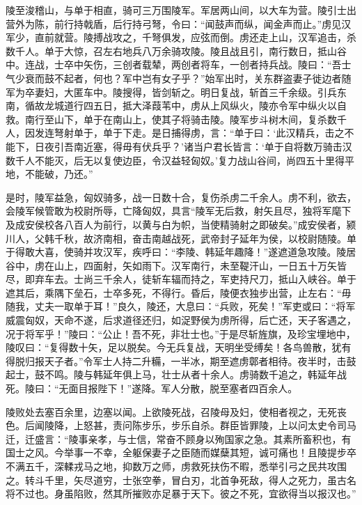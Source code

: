 \documentclass[12pt,UTF8]{ctexbook}
\begin{document}
陵至浚稽山，与单于相直，骑可三万围陵军。军居两山间，以大车为营。陵引士出营外为陈，前行持戟盾，后行持弓弩，令曰：“闻鼓声而纵，闻金声而止。”虏见汉军少，直前就营。陵搏战攻之，千弩俱发，应弦而倒。虏还走上山，汉军追击，杀数千人。单于大惊，召左右地兵八万余骑攻陵。陵且战且引，南行数日，抵山谷中。连战，士卒中矢伤，三创者载辇，两创者将车，一创者持兵战。陵曰：“吾士气少衰而鼓不起者，何也？军中岂有女子乎？”始军出时，关东群盗妻子徙边者随军为卒妻妇，大匿车中。陵搜得，皆剑斩之。明日复战，斩首三千余级。引兵东南，循故龙城道行四五日，抵大泽葭苇中，虏从上风纵火，陵亦令军中纵火以自救。南行至山下，单于在南山上，使其子将骑击陵。陵军步斗树木间，复杀数千人，因发连弩射单于，单于下走。是日捕得虏，言：“单于曰：‘此汉精兵，击之不能下，日夜引吾南近塞，得毋有伏兵乎？’诸当户君长皆言：‘单于自将数万骑击汉数千人不能灭，后无以复使边臣，令汉益轻匈奴。’复力战山谷间，尚四五十里得平地，不能破，乃还。”



是时，陵军益急，匈奴骑多，战一日数十合，复伤杀虏二千余人。虏不利，欲去，会陵军候管敢为校尉所辱，亡降匈奴，具言“陵军无后救，射矢且尽，独将军麾下及成安侯校各八百人为前行，以黄与白为帜，当使精骑射之即破矣。”成安侯者，颍川人，父韩千秋，故济南相，奋击南越战死，武帝封子延年为侯，以校尉随陵。单于得敢大喜，使骑并攻汉军，疾呼曰：“李陵、韩延年趣降！”遂遮道急攻陵。陵居谷中，虏在山上，四面射，矢如雨下。汉军南行，未至鞮汗山，一日五十万矢皆尽，即弃车去。士尚三千余人，徒斩车辐而持之，军吏持尺刀，抵山入峡谷。单于遮其后，乘隅下垒石，士卒多死，不得行。昏后，陵便衣独步出营，止左右：“毋随我，丈夫一取单于耳！”良久，陵还，大息曰：“兵败，死矣！”军吏或曰：“将军威震匈奴，天命不遂，后求道径还归，如浞野侯为虏所得，后亡还，天子客遇之，况于将军乎！”陵曰：“公止！吾不死，非壮士也。”于是尽斩旌旗，及珍宝埋地中，陵叹曰：“复得数十矢，足以脱矣。今无兵复战，天明坐受缚矣！各鸟兽散，犹有得脱归报天子者。”令军士人持二升糒，一半冰，期至遮虏鄣者相待。夜半时，击鼓起士，鼓不鸣。陵与韩延年俱上马，壮士从者十余人。虏骑数千追之，韩延年战死。陵曰：“无面目报陛下！”遂降。军人分散，脱至塞者四百余人。



陵败处去塞百余里，边塞以闻。上欲陵死战，召陵母及妇，使相者视之，无死丧色。后闻陵降，上怒甚，责问陈步乐，步乐自杀。群臣皆罪陵，上以问太史令司马迁，迁盛言：“陵事亲孝，与士信，常奋不顾身以殉国家之急。其素所畜积也，有国士之风。今举事一不幸，全躯保妻子之臣随而媒蘖其短，诚可痛也！且陵提步卒不满五千，深輮戎马之地，抑数万之师，虏救死扶伤不暇，悉举引弓之民共攻围之。转斗千里，矢尽道穷，士张空拳，冒白刃，北首争死敌，得人之死力，虽古名将不过也。身虽陷败，然其所摧败亦足暴于天下。彼之不死，宜欲得当以报汉也。”
\end{document}
